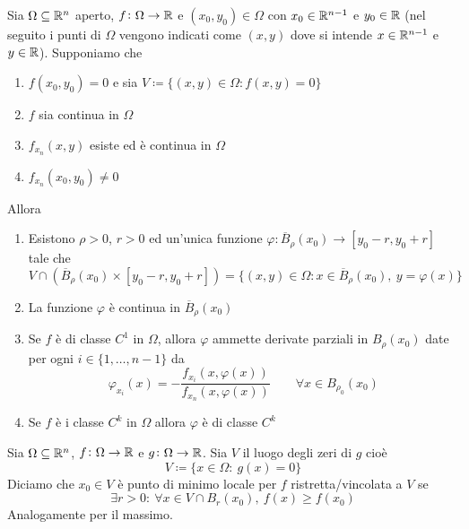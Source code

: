 \begin{thm} \label{thm:funzimpl}
	Sia $ \Omega \subseteq \mathbb{R}^n $ aperto, $ f \colon \Omega \to \mathbb{R} $ e $ (x_0, y_0) \in \Omega $ con $ x_0 \in \mathbb{R}^{n - 1} $ e $ y_0 \in \mathbb{R} $ (nel seguito i punti di $ \Omega $ vengono indicati come $ (x, y) $ dove si intende $ x \in \mathbb{R}^{n - 1} $ e $ y \in \mathbb{R} $). Supponiamo che
	\begin{enumerate}[label = (\roman*)]
		\item $ f(x_0, y_0) = 0 $ e sia $ V \coloneqq \{(x, y) \in \Omega : f(x, y) = 0\} $ 
		\item $ f $ sia continua in $ \Omega $ 
		\item $ f_{x_n}(x, y) $ esiste ed è continua in $ \Omega $ 
		\item $ f_{x_n}(x_0, y_0) \neq 0 $
	\end{enumerate}
	Allora
	\begin{enumerate}[label = (\arabic*)]
		\item Esistono $ \rho > 0 $, $ r > 0 $ ed un'unica funzione $ \varphi \colon \overline{B}_{\rho}(x_0) \to [y_0 - r, y_0 + r] $ tale che
		\[
			V \cap (\overline{B}_{\rho}(x_0)  \times [y_0 - r, y_0 + r]) = \{(x, y) \in \Omega : x \in \overline{B}_{\rho}(x_0) , \ y = \varphi(x)\}
		\]
		\item La funzione $ \varphi $ è continua in $ \overline{B}_{\rho}(x_0)  $
		\item Se $ f $ è di classe $ C^1 $ in $ \Omega $, allora $ \varphi $ ammette derivate parziali in $ B_{\rho}(x_0)  $ date per ogni $ i \in \{1, \ldots, n - 1\} $ da
		\begin{equation}
			\varphi_{x_i}(x) = - \frac{f_{x_i}(x, \varphi(x))}{f_{x_n}(x, \varphi(x))} \qquad \forall x \in B_{\rho_0}(x_0)
		\end{equation}
		\item Se $ f $ è i classe $ C^k $ in $ \Omega $ allora $ \varphi $ è di classe $ C^k $
	\end{enumerate} 
\end{thm}

\begin{definition}
	Sia $ \Omega \subseteq \mathbb{R}^n $, $ f \colon \Omega \to \mathbb{R} $ e $ g \colon \Omega \to \mathbb{R} $. Sia $ V $ il luogo degli zeri di $ g $ cioè 
	\begin{equation}
		V \coloneqq \{x \in \Omega : \ g(x) = 0\}
	\end{equation}
	Diciamo che $ x_0 \in V $ è punto di minimo locale per $ f $ ristretta/vincolata a $ V $ se 
	\begin{equation*}
		\exists r > 0 : \ \forall x \in V \cap B_r(x_0), \ f(x) \geq f(x_0)
	\end{equation*}
	Analogamente per il massimo.
\end{definition}

